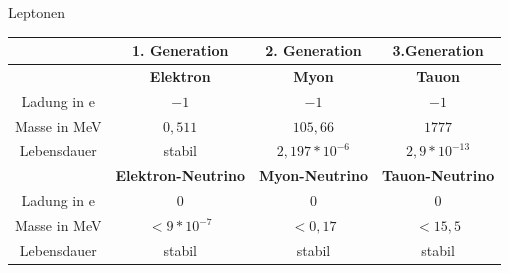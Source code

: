 \documentclass[aspectratio=169,xcolor=dvipsnames]{beamer}
\begin{document}
\begin{frame}{Leptonen}
    \begin{tabular}{c|c|c|c}
        \centering
                     & 1. Generation         & 2. Generation     & 3.Generation       \\ \hline
                     & \bf Elektron          & \bf Myon          & \bf Tauon          \\ \hline
        Ladung in e  & $-1$                  & $-1$              & $-1$               \\ \hline
        Masse in MeV & $0,511$               & $105,66$          & $1777$             \\ \hline

        Lebensdauer  & stabil                & $2,197*10^{-6}$   & $2,9*10^{-13}$     \\ \hline
                     & \bf Elektron-Neutrino & \bf Myon-Neutrino & \bf Tauon-Neutrino \\ \hline
        Ladung in e  & $0$                   & $0$               & $0$                \\ \hline
        Masse in MeV & $<9*10^{-7}$          & $<0,17$           & $<15,5$            \\ \hline
        Lebensdauer  & stabil                & stabil            & stabil
    \end{tabular}
\end{frame}
\end{document}
